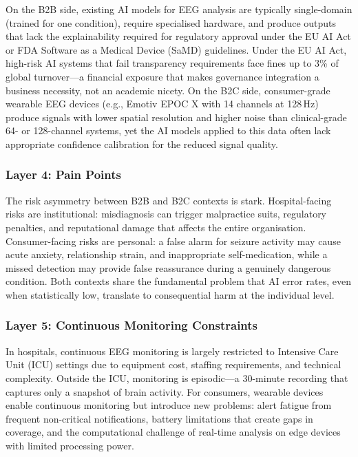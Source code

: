 On the B2B side, existing AI models for EEG analysis are typically single-domain (trained for one condition), require specialised hardware, and produce outputs that lack the explainability required for regulatory approval under the EU AI Act or FDA Software as a Medical Device (SaMD) guidelines. Under the EU AI Act, high-risk AI systems that fail transparency requirements face fines up to 3\% of global turnover---a financial exposure that makes governance integration a business necessity, not an academic nicety. On the B2C side, consumer-grade wearable EEG devices (e.g., Emotiv EPOC X with 14 channels at 128\,Hz) produce signals with lower spatial resolution and higher noise than clinical-grade 64- or 128-channel systems, yet the AI models applied to this data often lack appropriate confidence calibration for the reduced signal quality.

\subsubsection{Layer 4: Pain Points}

The risk asymmetry between B2B and B2C contexts is stark. Hospital-facing risks are institutional: misdiagnosis can trigger malpractice suits, regulatory penalties, and reputational damage that affects the entire organisation. Consumer-facing risks are personal: a false alarm for seizure activity may cause acute anxiety, relationship strain, and inappropriate self-medication, while a missed detection may provide false reassurance during a genuinely dangerous condition. Both contexts share the fundamental problem that AI error rates, even when statistically low, translate to consequential harm at the individual level.

\subsubsection{Layer 5: Continuous Monitoring Constraints}

In hospitals, continuous EEG monitoring is largely restricted to Intensive Care Unit (ICU) settings due to equipment cost, staffing requirements, and technical complexity. Outside the ICU, monitoring is episodic---a 30-minute recording that captures only a snapshot of brain activity. For consumers, wearable devices enable continuous monitoring but introduce new problems: alert fatigue from frequent non-critical notifications, battery limitations that create gaps in coverage, and the computational challenge of real-time analysis on edge devices with limited processing power.

